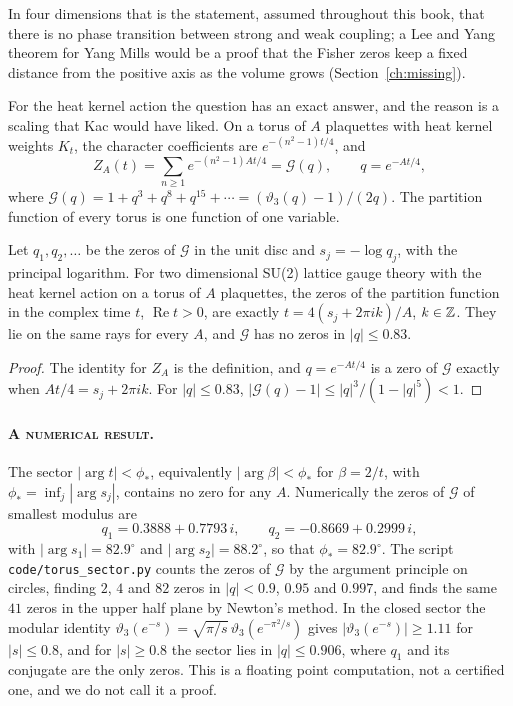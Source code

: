 In four dimensions that is the statement, assumed throughout this book, that there is no phase transition between strong and weak coupling; a Lee and Yang theorem for Yang Mills would be a proof that the Fisher zeros keep a fixed distance from the positive axis as the volume grows (Section~\ref{ch:missing}).

For the heat kernel action the question has an exact answer, and the reason is a scaling that Kac would have liked. On a torus of $A$ plaquettes with heat kernel weights $K_t$, the character coefficients are $e^{-(n^2-1)t/4}$, and
\[
Z_A(t)=\sum_{n\ge1}e^{-(n^2-1)At/4}=\mathcal G(q),\qquad q=e^{-At/4},
\]
where $\mathcal G(q)=1+q^3+q^8+q^{15}+\cdots=(\vartheta_3(q)-1)/(2q)$.
The partition function of every torus is one function of one variable.

\begin{theorem}\label{thm:sector}
Let $q_1,q_2,\dots$ be the zeros of $\mathcal G$ in the unit disc and $s_j=-\log q_j$, with the principal logarithm. For two dimensional SU(2) lattice gauge theory with the heat kernel action on a torus of $A$ plaquettes, the zeros of the partition function in the complex time $t$, $\operatorname{Re}t>0$, are exactly $t=4(s_j+2\pi ik)/A$, $k\in\mathbb{Z}$. They lie on the same rays for every $A$, and $\mathcal G$ has no zeros in $|q|\le0.83$.
\end{theorem}

\begin{proof}
The identity for $Z_A$ is the definition, and $q=e^{-At/4}$ is a zero of $\mathcal G$ exactly when $At/4=s_j+2\pi ik$. For $|q|\le0.83$, $|\mathcal G(q)-1|\le|q|^3/(1-|q|^5)<1$.
\end{proof}

\paragraph{\normalfont\scshape A numerical result.} The sector $|\arg t|<\phi_*$, equivalently $|\arg\beta|<\phi_*$ for $\beta=2/t$, with $\phi_*=\inf_j|\arg s_j|$, contains no zero for any $A$. Numerically the zeros of $\mathcal G$ of smallest modulus are
\[
q_1=0.3888+0.7793\,i,\qquad q_2=-0.8669+0.2999\,i,
\]
with $|\arg s_1|=82.9^\circ$ and $|\arg s_2|=88.2^\circ$, so that $\phi_*=82.9^\circ$. The script \texttt{code/torus\_sector.py} counts the zeros of $\mathcal G$ by the argument principle on circles, finding $2$, $4$ and $82$ zeros in $|q|<0.9$, $0.95$ and $0.997$, and finds the same $41$ zeros in the upper half plane by Newton's method. In the closed sector the modular identity $\vartheta_3(e^{-s})=\sqrt{\pi/s}\,\vartheta_3(e^{-\pi^2/s})$ gives $|\vartheta_3(e^{-s})|\ge1.11$ for $|s|\le0.8$, and for $|s|\ge0.8$ the sector lies in $|q|\le0.906$, where $q_1$ and its conjugate are the only zeros. This is a floating point computation, not a certified one, and we do not call it a proof.

